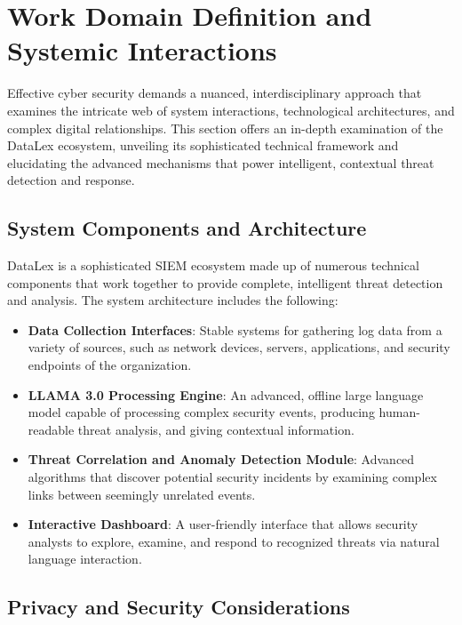 \section{Work Domain Definition and Systemic Interactions}
\label{sec_work_domain}

Effective cyber security demands a nuanced, interdisciplinary approach that examines the intricate web of system interactions, technological architectures, and complex digital relationships. This section offers an in-depth examination of the DataLex ecosystem, unveiling its sophisticated technical framework and elucidating the advanced mechanisms that power intelligent, contextual threat detection and response.

\subsection{System Components and Architecture}
\label{subsec_system_components_and_architecture}

DataLex is a sophisticated SIEM ecosystem made up of numerous technical components that work together to provide complete, intelligent threat detection and analysis. The system architecture includes the following:

\begin{itemize}
    \item \textbf{Data Collection Interfaces}: Stable systems for gathering log data from a variety of sources, such as network devices, servers, applications, and security endpoints of the organization.
    \item \textbf{LLAMA 3.0 Processing Engine}: An advanced, offline large language model capable of processing complex security events, producing human-readable threat analysis, and giving contextual information.
    \item \textbf{Threat Correlation and Anomaly Detection Module}: Advanced algorithms that discover potential security incidents by examining complex links between seemingly unrelated events.
    \item \textbf{Interactive Dashboard}: A user-friendly interface that allows security analysts to explore, examine, and respond to recognized threats via natural language interaction.
\end{itemize}

\subsection{Privacy and Security Considerations}
\label{subsec_privacy_and_security_considerations}


